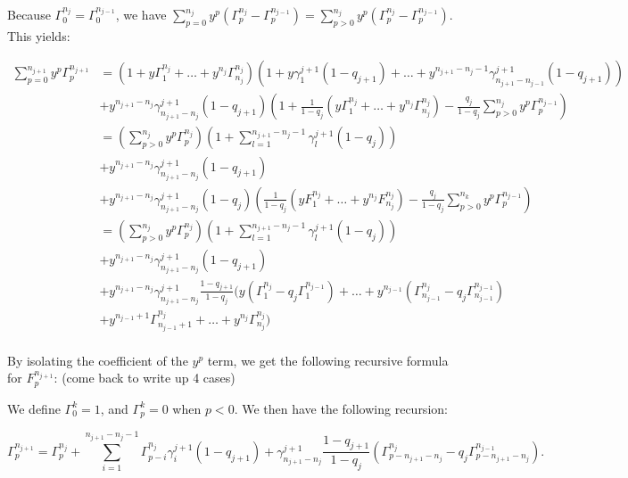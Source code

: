 \documentclass[12pt]{amsart}
\theoremstyle{remark}
\newcommand{\F}[2]{\Gamma_{#1}^{#2}}
\newcommand{\TTau}[2]{\gamma_{#1}^{#2}}
\begin{document}
Because $\F{0}{n_j} = \F{0}{n_{j-1}}$, we have $\sum_{p = 0}^{n_j} y^p(\F{p}{n_j} - \F{p}{n_{j-1}}) = \sum_{p > 0}^{n_j} y^p(\F{p}{n_j} - \F{p}{n_{j-1}})$. This yields:

\begin{equation*}
\begin{split}
    \sum_{p=0}^{n_{j+1}} y^p \F{p}{n_{j+1}} 
    &= (1 + y\F{1}{n_j} + \ldots + y^{n_j}\F{n_j}{n_j}) 
    \left(1 + y\TTau{1}{j+1}(1-q_{j+1}) + \ldots + y^{n_{j+1}-n_j-1} \TTau{n_{j+1} - n_{j-1}}{j+1}(1-q_{j+1}) \right) \\
    &+ y^{n_{j+1}-n_j}\TTau{n_{j+1}-n_j}{j+1}(1-q_{j+1}) \left(1 + \frac{1}{1-q_j}(y\F{1}{n_j} + \ldots + y^{n_j}\F{n_j}{n_j}) 
    - \frac{q_j}{1-q_j}\sum_{p>0}^{n_j} y^p \F{p}{n_{j-1}}\right) \\
    &= (\sum_{p>0}^{n_j}y^p\F{p}{n_j})\left(1+ \sum_{l=1}^{n_{j+1}-n_j-1}\TTau{l}{j+1}(1-q_j)\right) \\
    &+ y^{n_{j+1}-n_j}\TTau{n_{j+1}-n_j}{j+1}(1-q_{j+1}) \\
    &+ y^{n_{j+1}-n_j}\TTau{n_{j+1}-n_j}{j+1}(1-q_j)\left(\frac{1}{1-q_j}(yF_1^{n_j} + \ldots + y^{n_j}F_{n_j}^{n_j}) - \frac{q_j}{1-q_j} \sum_{p>0}^{n_k} y^p\F{p}{n_{j-1}}\right) \\
    &= (\sum_{p>0}^{n_j}y^p\F{p}{n_j})\left(1+ \sum_{l=1}^{n_{j+1}-n_j-1}\TTau{l}{j+1}(1-q_j)\right) \\
    &+ y^{n_{j+1}-n_j}\TTau{n_{j+1}-n_j}{j+1}(1-q_{j+1}) \\
    &+ y^{n_{j+1}-n_j}\TTau{n_{j+1}-n_j}{j+1}\frac{1-q_{j+1}}{1-q_j}(y(\F{1}{n_j} - q_j\F{1}{n_{j-1}}) + \ldots + y^{n_{j-1}}(\F{n_{j-1}}{n_j} - q_j \F{n_{j-1}}{n_{j-1}}) \\ &+y^{n_{j-1}+1}\F{n_{j-1}+1}{n_j} + 
    \ldots + y^{n_j}\F{n_j}{n_j}) \\
\end{split}
\end{equation*}

By isolating the coefficient of the $y^p$ term, we get the following recursive formula for $F_p^{n_{j+1}}$:
(come back to write up 4 cases)

We define $\F{0}{k} = 1$, and $\F{p}{k}  = 0$ when $p < 0$. We then have the following recursion:

\begin{equation}
\F{p}{n_{j+1}} = \F{p}{n_j} + \sum_{i=1}^{n_{j+1}-n_j-1} \F{p-i}{n_j}\TTau{i}{j+1}(1-q_{j+1}) + \TTau{n_{j+1} - n_j}{j+1}\frac{1-q_{j+1}}{1-q_j} \left(\F{p-n_{j+1}-n_j}{n_j} - q_j  \F{p-n_{j+1}-n_j}{n_{j-1}} \right).
\end{equation}
\end{document}
